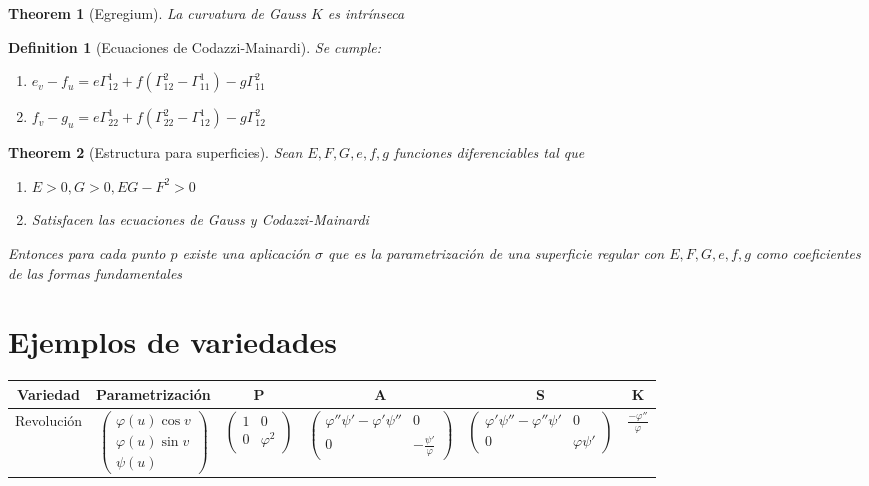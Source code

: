 \documentclass[leqno]{article}
\newtheorem*{definition}{Definition}
\newtheorem*{theorem}{Theorem}
\begin{document}
\begin{theorem}[Egregium] La curvatura de Gauss $K$ es intrínseca
\end{theorem}

\begin{definition}[Ecuaciones de Codazzi-Mainardi] Se cumple:
  \begin{enumerate}[topsep=-6pt, itemsep=0pt]
    \item $e_v-f_u = e\Gamma_{12}^1 + f(\Gamma_{12}^2 - \Gamma _{11}^1) - g\Gamma_{11}^2$
	\item $f_v-g_u = e\Gamma_{22}^1 + f(\Gamma_{22}^2-\Gamma_{12}^1)-g\Gamma_{12}^2$
  \end{enumerate}
\end{definition}

\begin{theorem}[Estructura para superficies] Sean $E, F, G, e, f, g$ funciones diferenciables tal que
   \begin{enumerate}[topsep=-6pt, itemsep=0pt]
    \item $E>0, G>0, EG-F^2>0$
	\item Satisfacen las ecuaciones de Gauss y Codazzi-Mainardi
  \end{enumerate}
Entonces para cada punto $p$ existe una aplicación $\sigma $ que es la parametrización de una superficie regular con $E, F, G, e, f, g$ como coeficientes de las formas fundamentales
\end{theorem}



\section{Ejemplos de variedades}
\begin{center}
\begin{tabular}{|c|c|c|c|c|c|}
\hline
\textbf{Variedad} & \textbf{Parametrización} & \textbf{P} & \textbf{A} & \textbf{S} & \textbf{K} \\
\hline
Revolución & $\begin{pmatrix} \varphi (u)\cos v \\ \varphi (u) \sin v \\ \psi (u) \end{pmatrix} $ & $\begin{pmatrix} 1 & 0 \\ 0 & \varphi^2 \end{pmatrix} $ & $\begin{pmatrix} \varphi ''\psi '-\varphi '\psi ''& 0 \\ 0 & -\frac{\psi '}{\varphi } \end{pmatrix} $ & $\begin{pmatrix} \varphi '\psi ''-\varphi ''\psi '& 0 \\ 0 & \varphi \psi ' \end{pmatrix} $ & $\frac{-\varphi''}{\varphi }$ \\
\hline
\end{tabular}
\end{center}
\end{document}
